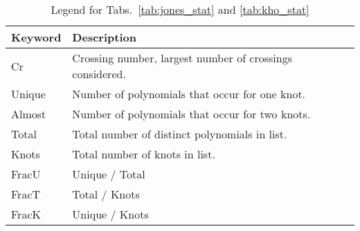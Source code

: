 \documentclass{article}
\theoremstyle{plain}
\begin{document}
        \begin{table}
            \centering
            \begin{tabular}{| l | l |}
                \hline
                Keyword & Description\\
                \hline
                Cr     & Crossing number, largest number of crossings considered.\\
                Unique & Number of polynomials that occur for one knot.\\
                Almost & Number of polynomials that occur for two knots.\\
                Total  & Total number of distinct polynomials in list.\\
                Knots  & Total number of knots in list.\\
                FracU  & Unique / Total\\
                FracT  & Total / Knots\\
                FracK  & Unique / Knots\\
                \hline
            \end{tabular}
            \caption{Legend for Tabs.~\ref{tab:jones_stat} and \ref{tab:kho_stat}}
            \label{tab:key}
        \end{table}
\end{document}
